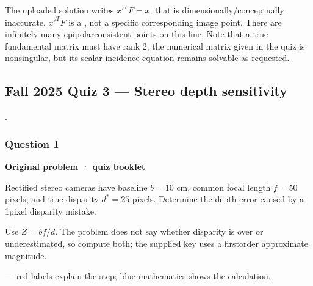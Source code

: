 \documentclass[letterpaper,11pt,english,openany,oneside]{jupyterBook}
\begin{document}
\par

\sphinxAtStartPar
{} The uploaded solution writes \(x'^TF=x\); that is dimensionally/conceptually inaccurate. \(x'^TF\) is a , not a specific corresponding image point. There are infinitely many epipolar\sphinxhyphen{}consistent points on this line. Note that a true fundamental matrix must have rank 2; the numerical matrix given in the quiz is nonsingular, but its scalar incidence equation remains solvable as requested.


\subsection{Fall 2025 Quiz 3 — Stereo depth sensitivity}
\label{\detokenize{lectures/lecture04/quiz-workbook:fall-2025-quiz-3-stereo-depth-sensitivity}}\label{\detokenize{lectures/lecture04/quiz-workbook:quiz-source-4}}
\sphinxAtStartPar
{} .


\subsubsection{Question 1}
\label{\detokenize{lectures/lecture04/quiz-workbook:quiz-4-q1}}\label{\detokenize{lectures/lecture04/quiz-workbook:ex-lec04-stereo-fall}}\label{\detokenize{lectures/lecture04/quiz-workbook:id3}}
\par\medskip\textbf{Original problem · quiz booklet}\par\smallskip

\sphinxAtStartPar
Rectified stereo cameras have baseline \(b=10\) cm, common focal length \(f=50\) pixels, and true disparity \(d^*=25\) pixels. Determine the depth error caused by a 1\sphinxhyphen{}pixel disparity mistake.

\par\medskip

\sphinxAtStartPar
{}

\sphinxAtStartPar
Use \(Z=bf/d\). The problem does not say whether disparity is over\sphinxhyphen{} or underestimated, so compute both; the supplied key uses a first\sphinxhyphen{}order approximate magnitude.

\sphinxAtStartPar
{} — red labels explain the step; blue mathematics shows the calculation.
\end{document}
